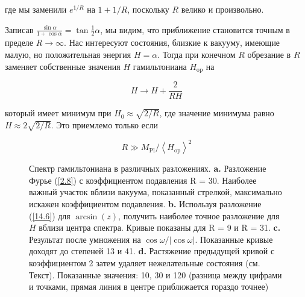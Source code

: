 \documentclass[main.tex]{subfiles}
\begin{document}
где мы заменили $e^{1 / R}$ на $1+1/R$, поскольку $R$ велико и произвольно.
 
Записав $\frac{\sin \alpha}{1+\cos\alpha} = \tan\frac 1 2 \alpha$, мы видим, что приближение становится точным в пределе $R \rightarrow\infty$. Нас интересуют состояния, близкие к вакууму, имеющие малую, но положительная энергия $H = \alpha$. Тогда при конечном $R$ обрезание в $R$ заменяет собственные значения $H$ гамильтониана $H_\mathrm{op}$ на

\begin{equation}\label{14.3}
	H \rightarrow H + \frac{2}{RH}
\end{equation}
            
который имеет минимум при $H_0 \approx\sqrt{2 / R}$, где значение минимума равно $H \approx 2\sqrt{2 / R}$. Это приемлемо только если

\begin{equation}\label{14.4}
	R \gg M_{\mathrm{Pl}} /\left\langle H_{\mathrm{op}}\right\rangle^{2}
\end{equation}

\begin{figure}[ht]
\begin{center}
\caption{
\label{i14.1} Спектр гамильтониана в различных разложениях. \textbf{a.} Разложение Фурье (\ref{2.8}) с коэффициентом подавления R = 30. Наиболее важный участок вблизи вакуума, показанный стрелкой, максимально искажен коэффициентом подавления. \textbf{b.} Используя разложение (\ref{14.6}) для $\arcsin(z)$, получить наиболее точное разложение для $H$ вблизи центра спектра. Кривые показаны для R = 9 и R = 31. \textbf{c.} Результат после умножения на $\cos\omega/|\cos\omega|$. Показанные кривые доходят до степеней 13 и 41. \textbf{d.} Растяжение предыдущей кривой с коэффициентом 2 затем удаляет нежелательные состояния (см. Текст). Показанные значения: 10, 30 и 120 (разница между цифрами и точками, прямая линия в центре приближается гораздо точнее)}
\end {center}
\end {figure}
\end{document}
